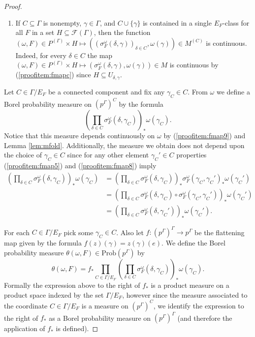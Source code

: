 \documentclass[12pt]{amsart}
\theoremstyle{definition}
\def\cal{\mathcal}
\newcommand{\Prob}{\mathrm{Prob}}
\begin{document}
\begin{proof}
\begin{enumerate}
		\item \label{proofitem:fmap9} If $C \subseteq \Gamma$ is nonempty, $\gamma \in \Gamma$, and $C \cup \{\gamma\}$ is contained in a single $E_F$-class for all $F$ in a set $H \subseteq \cal F(\Gamma)$, then the function $(\omega, F) \in P^{(\Gamma)} \times H \mapsto ((\sigma_F^\omega(\delta, \gamma))_{\delta \in C}, \omega(\gamma)) \in M^{(C)}$ is continuous. Indeed, for every $\delta \in C$ the map $(\omega, F) \in P^{(\Gamma)} \times H \mapsto (\sigma_F^\omega(\delta, \gamma), \omega(\gamma)) \in M$ is continuous by (\ref{proofitem:fmapc}) since $H \subseteq U_{\delta, \gamma}$.
	\end{enumerate}
	
	Let $C \in \Gamma / E_F$ be a connected component and fix any $\gamma_C \in C$. From $\omega$ we define a Borel probability measure on $(p^\Gamma)^C$ by the formula
	\[\left( \prod_{\delta \in C} \sigma_F^\omega(\delta, \gamma_C) \right)_* \omega(\gamma_C).\]
	Notice that this measure depends continuously on $\omega$ by (\ref{proofitem:fmap9}) and Lemma \ref{lem:mfold}. Additionally, the measure we obtain does not depend upon the choice of $\gamma_C \in C$ since for any other element $\gamma_C' \in C$ properties (\ref{proofitem:fmap5}) and (\ref{proofitem:fmap8}) imply
	\begin{align*}
		\left(\prod_{\delta \in C} \sigma_F^\omega(\delta, \gamma_C) \right)_* \omega(\gamma_C) & = \left(\prod_{\delta \in C} \sigma_F^\omega(\delta, \gamma_C) \right)_* \sigma_F^\omega(\gamma_C, \gamma_C')_* \omega(\gamma_C')\\
		& = \left( \prod_{\delta \in C} \sigma_F^\omega(\delta, \gamma_C) \circ \sigma_F^\omega(\gamma_C, \gamma_C') \right)_* \omega(\gamma_C')\\
		& = \left( \prod_{\delta \in C} \sigma_F^\omega(\delta, \gamma_C') \right)_* \omega(\gamma_C').
	\end{align*}
	
	For each $C \in \Gamma / E_F$ pick some $\gamma_C \in C$. Also let $f : (p^\Gamma)^\Gamma \rightarrow p^\Gamma$ be the flattening map given by the formula $f(z)(\gamma) = z(\gamma)(e)$. We define the Borel probability measure $\theta(\omega, F) \in \Prob(p^\Gamma)$ by
	\[\theta(\omega, F) = f_* \prod_{C \in \Gamma / E_F} \left( \prod_{\delta \in C} \sigma_F^\omega(\delta, \gamma_C) \right)_* \omega(\gamma_C).\]
	Formally the expression above to the right of $f_*$ is a product measure on a product space indexed by the set $\Gamma / E_F$, however since the measure associated to the coordinate $C \in \Gamma / E_F$ is a measure on $(p^\Gamma)^C$, we identify the expression to the right of $f_*$ as a Borel probability measure on $(p^\Gamma)^\Gamma$ (and therefore the application of $f_*$ is defined).
	

\end{proof}
\end{document}
